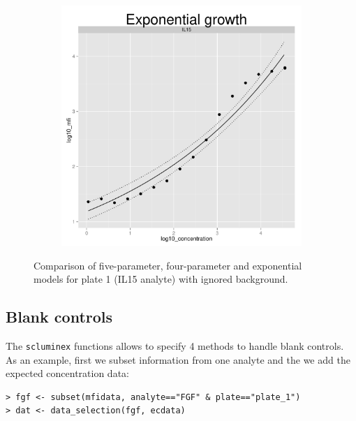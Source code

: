 \documentclass[11pt]{article}\usepackage[]{graphicx}\usepackage[]{color}
\makeatletter
\def\maxwidth{ %
  \ifdim\Gin@nat@width>\linewidth
    \linewidth
  \else
    \Gin@nat@width
  \fi
}
\newenvironment{kframe}{%
 \def\at@end@of@kframe{}%
 \ifinner\ifhmode%
  \def\at@end@of@kframe{\end{minipage}}%
  \begin{minipage}{\columnwidth}%
 \fi\fi%
 \def\FrameCommand##1{\hskip\@totalleftmargin \hskip-\fboxsep
 \colorbox{shadecolor}{##1}\hskip-\fboxsep
     \hskip-\linewidth \hskip-\@totalleftmargin \hskip\columnwidth}%
 \MakeFramed {\advance\hsize-\width
   \@totalleftmargin\z@ \linewidth\hsize
   \@setminipage}}%
 {\par\unskip\endMakeFramed%
 \at@end@of@kframe}
\newenvironment{knitrout}{}{} %
\makeatother
\begin{document}
\begin{figure}[!ht]
\begin{center}
\begin{subfigure}{.28\textwidth}
\begin{knitrout}
\end{knitrout}
    \end{subfigure}
    \begin{subfigure}{.28\textwidth}
\begin{knitrout}
\color{fgcolor}
\includegraphics[width=\maxwidth]{./unnamed-chunk-17-1} 

\end{knitrout}
    \end{subfigure}
    \caption{Comparison of five-parameter, four-parameter and exponential 
    models for plate 1 (IL15 analyte) with ignored background.}
\label{fig:modelscomp}
\end{center}
\end{figure}



\subsection{Blank controls}
The {\tt scluminex} functions allows to specify 4 methods to handle 
blank controls. As an example, first we subset information from one 
analyte and the we add the expected concentration data:

\begin{knitrout}
\color{fgcolor}\begin{kframe}
\begin{verbatim}
> fgf <- subset(mfidata, analyte=="FGF" & plate=="plate_1")
> dat <- data_selection(fgf, ecdata) 
\end{verbatim}
\end{kframe}
\end{knitrout}
\end{document}
